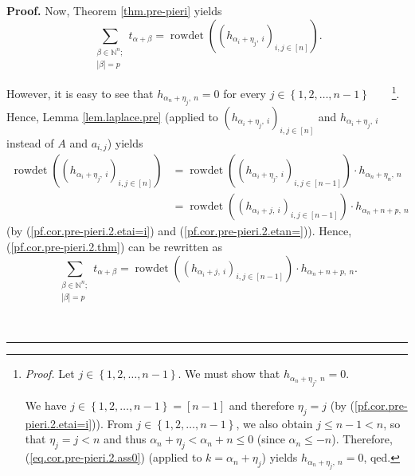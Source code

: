 \documentclass[numbers=enddot,12pt,final,onecolumn,notitlepage,english]{scrartcl}%
\theoremstyle{definition}
\newenvironment{proof}[1][Proof]{\noindent\textbf{#1.} }{\ \rule{0.5em}{0.5em}}
\let\sumnonlimits\sum
\renewcommand{\sum}{\sumnonlimits\limits}
\newenvironment{vershort}{}{}
\begin{document}
\begin{proof}
Now, Theorem \ref{thm.pre-pieri} yields%
\begin{equation}
\sum_{\substack{\beta\in\mathbb{N}^{n};\\\left\vert \beta\right\vert
=p}}t_{\alpha+\beta}=\operatorname*{rowdet}\left(  \left(  h_{\alpha_{i}%
+\eta_{j},\ i}\right)  _{i,j\in\left[  n\right]  }\right)  .
\label{pf.cor.pre-pieri.2.thm}%
\end{equation}


\begin{vershort}
However, it is easy to see that $h_{\alpha_{n}+\eta_{j},\ n}=0$ for every
$j\in\left\{  1,2,\ldots,n-1\right\}  $\ \ \ \ \footnote{\textit{Proof.} Let
$j\in\left\{  1,2,\ldots,n-1\right\}  $. We must show that $h_{\alpha_{n}%
+\eta_{j},\ n}=0$.
\par
We have $j\in\left\{  1,2,\ldots,n-1\right\}  =\left[  n-1\right]  $ and
therefore $\eta_{j}=j$ (by (\ref{pf.cor.pre-pieri.2.etai=i})). From
$j\in\left\{  1,2,\ldots,n-1\right\}  $, we also obtain $j\leq n-1<n$, so that
$\eta_{j}=j<n$ and thus $\alpha_{n}+\eta_{j}<\alpha_{n}+n\leq0$ (since
$\alpha_{n}\leq-n$). Therefore, (\ref{eq.cor.pre-pieri.2.ass0}) (applied to
$k=\alpha_{n}+\eta_{j}$) yields $h_{\alpha_{n}+\eta_{j},\ n}=0$, qed.}. Hence,
Lemma \ref{lem.laplace.pre} (applied to $\left(  h_{\alpha_{i}+\eta_{j}%
,\ i}\right)  _{i,j\in\left[  n\right]  }$ and $h_{\alpha_{i}+\eta_{j},\ i}$
instead of $A$ and $a_{i,j}$) yields%
\begin{align*}
\operatorname*{rowdet}\left(  \left(  h_{\alpha_{i}+\eta_{j},\ i}\right)
_{i,j\in\left[  n\right]  }\right)   &  =\operatorname*{rowdet}\left(  \left(
h_{\alpha_{i}+\eta_{j},\ i}\right)  _{i,j\in\left[  n-1\right]  }\right)
\cdot h_{\alpha_{n}+\eta_{n},\ n}\\
&  =\operatorname*{rowdet}\left(  \left(  h_{\alpha_{i}+j,\ i}\right)
_{i,j\in\left[  n-1\right]  }\right)  \cdot h_{\alpha_{n}+n+p,\ n}%
\end{align*}
(by (\ref{pf.cor.pre-pieri.2.etai=i}) and (\ref{pf.cor.pre-pieri.2.etan=})).
Hence, (\ref{pf.cor.pre-pieri.2.thm}) can be rewritten as%
\[
\sum_{\substack{\beta\in\mathbb{N}^{n};\\\left\vert \beta\right\vert
=p}}t_{\alpha+\beta}=\operatorname*{rowdet}\left(  \left(  h_{\alpha
_{i}+j,\ i}\right)  _{i,j\in\left[  n-1\right]  }\right)  \cdot h_{\alpha
_{n}+n+p,\ n}.
\]

\end{vershort}


\end{proof}
\end{document}
